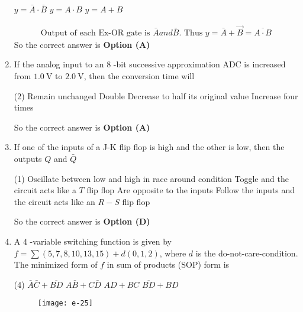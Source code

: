 \begin{enumerate}
\begin{tasks}
\task[\textbf{B.}] $y=\bar{A} \cdot \bar{B}$
\task[\textbf{C.}] $y=A \cdot B$
\task[\textbf{D.}] $y=A+B$
\end{tasks}
\begin{answer}
\begin{align*}
\text{Output of each Ex-OR gate is }\bar{A} and \bar{B}.\text{ Thus }y=\bar{A}+\vec{B}=\overline{A \cdot B}
\end{align*}
So the correct answer is \textbf{Option (A)}
\end{answer}
	\item If the analog input to an 8 -bit successive approximation ADC is increased from $1.0 \mathrm{~V}$ to $2.0 \mathrm{~V}$, then the conversion time will
	{}
\begin{tasks}(2)
\task[\textbf{A.}] Remain unchanged
\task[\textbf{B.}] Double
\task[\textbf{C.}] Decrease to half its original value
\task[\textbf{D.}] Increase four times
\end{tasks}
\begin{answer}
So the correct answer is \textbf{Option (A)}
\end{answer}
	\item If one of the inputs of a J-K flip flop is high and the other is low, then the outputs $Q$ and $\bar{Q}$
{	}
\begin{tasks}(1)
\task[\textbf{A.}] Oscillate between low and high in race around condition
\task[\textbf{B.}] Toggle and the circuit acts like a $T$ flip flop
\task[\textbf{C.}] Are opposite to the inputs
\task[\textbf{D.}] Follow the inputs and the circuit acts like an $R-S$ flip flop
\end{tasks}
\begin{answer}
So the correct answer is \textbf{Option (D)}
\end{answer}
	\item A 4 -variable switching function is given by $f=\sum(5,7,8,10,13,15)+d(0,1,2)$, where $d$ is the do-not-care-condition. The minimized form of $f$ in sum of products (SOP) form is
	{}
\begin{tasks}(4)
\task[\textbf{A.}] $\bar{A} \bar{C}+\overline{B D}$
\task[\textbf{B.}] $A \bar{B}+C \bar{D}$
\task[\textbf{C.}]  $A D+B C$
\task[\textbf{D.}] $\overline{B D}+B D$
\end{tasks}
\begin{answer}
\begin{figure}[H]
	\centering
	\texttt{[image: e-25]}
\end{figure}

\end{answer}
\end{enumerate}
